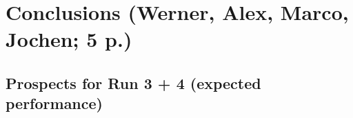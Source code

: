 \section{Conclusions (Werner, Alex, Marco, Jochen; 5 p.)}
\subsection{Prospects for Run 3 + 4 (expected performance)}
